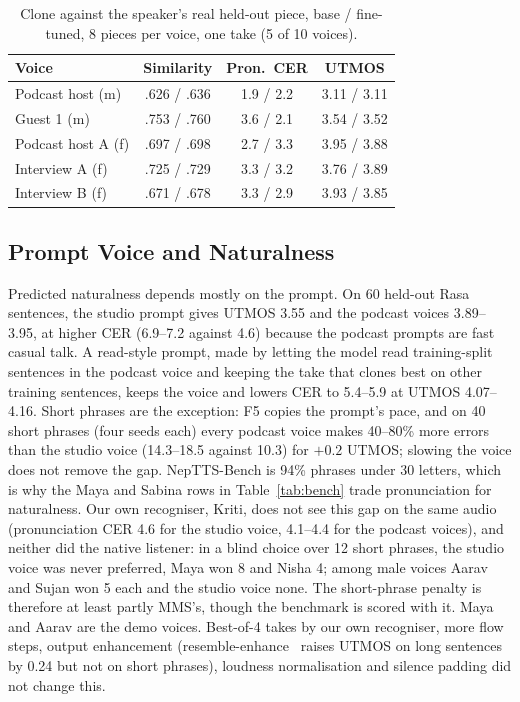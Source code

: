 \begin{table}[t]\centering\small
\caption{Clone against the speaker's real held-out piece, base / fine-tuned, 8 pieces per voice, one take (5 of 10 voices).}\label{tab:pod}
\begin{tabular}{lccc}\toprule
Voice & Similarity & Pron.\ CER & UTMOS\\\midrule
Podcast host (m) & .626 / .636 & 1.9 / 2.2 & 3.11 / 3.11\\
Guest 1 (m) & .753 / .760 & 3.6 / 2.1 & 3.54 / 3.52\\
Podcast host A (f) & .697 / .698 & 2.7 / 3.3 & 3.95 / 3.88\\
Interview A (f) & .725 / .729 & 3.3 / 3.2 & 3.76 / 3.89\\
Interview B (f) & .671 / .678 & 3.3 / 2.9 & 3.93 / 3.85\\\bottomrule
\end{tabular}
\end{table}

\subsection{Prompt Voice and Naturalness}\label{sec:voice}
Predicted naturalness depends mostly on the prompt. On 60 held-out Rasa sentences, the studio prompt gives UTMOS 3.55 and the podcast voices 3.89--3.95, at higher CER (6.9--7.2 against 4.6) because the podcast prompts are fast casual talk. A read-style prompt, made by letting the model read training-split sentences in the podcast voice and keeping the take that clones best on other training sentences, keeps the voice and lowers CER to 5.4--5.9 at UTMOS 4.07--4.16. Short phrases are the exception: F5 copies the prompt's pace, and on 40 short phrases (four seeds each) every podcast voice makes 40--80\% more errors than the studio voice (14.3--18.5 against 10.3) for $+0.2$ UTMOS; slowing the voice does not remove the gap. NepTTS-Bench is 94\% phrases under 30 letters, which is why the Maya and Sabina rows in Table~\ref{tab:bench} trade pronunciation for naturalness. Our own recogniser, Kriti, does not see this gap on the same audio (pronunciation CER 4.6 for the studio voice, 4.1--4.4 for the podcast voices), and neither did the native listener: in a blind choice over 12 short phrases, the studio voice was never preferred, Maya won 8 and Nisha 4; among male voices Aarav and Sujan won 5 each and the studio voice none. The short-phrase penalty is therefore at least partly MMS's, though the benchmark is scored with it. Maya and Aarav are the demo voices. Best-of-4 takes by our own recogniser, more flow steps, output enhancement (resemble-enhance~\citep{resembleenhance} raises UTMOS on long sentences by 0.24 but not on short phrases), loudness normalisation and silence padding did not change this.

